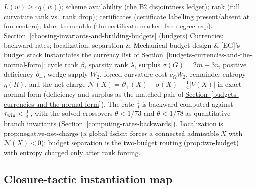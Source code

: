 \documentclass[
  11pt,
]{article}
\theoremstyle{definition}
\newcommand{\secref}[1]{\hyperref[#1]{Section~\ref*{#1}}}
\begin{document}
\begin{longtable}[]
\(L(w)\ge 4q(w)\)); scheme availability (the B2 disjointness ledger);
rank (full curvature rank vs.~rank drop); certificates (certificate
labelling present/absent at fan centers); label thresholds (the
certificate-marked fan-degree cap). \\
\secref{choosing-invariants-and-building-budgets} (budgets) Currencies; backward rates; localization; separation &
Mechanical budget design & {[}EG{]}'s budget stack instantiates the
currency list of \secref{budgets-currencies-and-the-normal-form}: cycle rank \(\beta\), sparsity rank \(\lambda\),
surplus \(\sigma(G)=2m-3n\), positive deficiency \(\partial_+\), wedge
supply \(W_2\), forced curvature cost \(c_\Omega W_2\), remainder
entropy \(\eta(R)\), and the net charge
\(\mathcal N(X)=\partial_+(X)-\sigma(X)-\tfrac14|V(X)|\) in exact normal
form (deficiency and surplus as the matched pair of \secref{budgets-currencies-and-the-normal-form}). The rate
\(\tfrac14\) is backward-computed against \(\tau_{\rm win}<\tfrac14\),
with the solved crossovers \(\theta<1/73\) and \(\theta<1/78\) as
quantitative branch invariants (\secref{computing-rates-backwards}). Localization is
prop:negative-net-charge (a global deficit forces a connected admissible
\(X\) with \(\mathcal N(X)<0\)); budget separation is the two-budget
routing (prop:two-budget) with entropy charged only after rank
forcing. \\
\end{longtable}

\subsection{Closure-tactic instantiation
map}\label{b.2-closure-tactic-instantiation-map}
\end{document}
